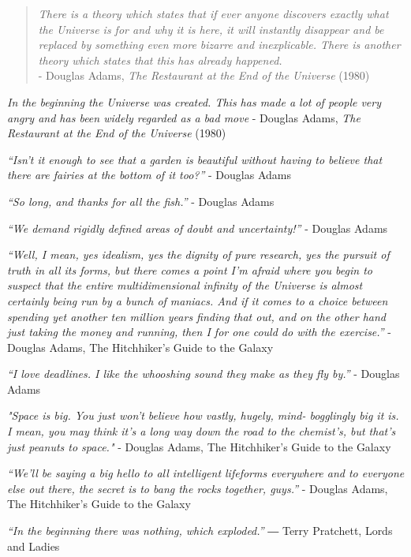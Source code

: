 

\begin{quote}
\emph{There is a theory which states that if ever anyone discovers exactly what the Universe is for 
and why it is here, it will instantly disappear and be replaced by something even more bizarre and inexplicable.
There is another theory which states that this has already happened.} \\
- Douglas Adams, \emph{The Restaurant at the End of the Universe} (1980)
\end{quote}


\emph{In the beginning the Universe was created.
This has made a lot of people very angry and has been widely regarded as a bad move}
- Douglas Adams, \emph{The Restaurant at the End of the Universe} (1980)


\emph{“Isn't it enough to see that a garden is beautiful without having to believe that there 
are fairies at the bottom of it too?” } 
- Douglas Adams

\emph{“So long, and thanks for all the fish.”} 
- Douglas Adams

\emph{“We demand rigidly defined areas of doubt and uncertainty!”} 
- Douglas Adams


\emph{“Well, I mean, yes idealism, yes the dignity of pure research, yes the pursuit of truth in all its forms, 
but there comes a point I'm afraid where you begin to suspect that the entire multidimensional infinity of 
the Universe is almost certainly being run by a bunch of maniacs. And if it comes to a choice between spending 
yet another ten million years finding that out, and on the other hand just taking the money and running, 
then I for one could do with the exercise.” }
- Douglas Adams, The Hitchhiker's Guide to the Galaxy

\emph{“I love deadlines. I like the whooshing sound they make as they fly by.” } 
- Douglas Adams

\emph{"Space is big. You just won't believe how vastly, hugely, mind- bogglingly big it is.
 I mean, you may think it's a long way down the road to the chemist's, but that's just peanuts to space."}
- Douglas Adams, The Hitchhiker's Guide to the Galaxy

\emph{“We'll be saying a big hello to all intelligent lifeforms everywhere and 
to everyone else out there, the secret is to bang the rocks together, guys.”}
- Douglas Adams, The Hitchhiker's Guide to the Galaxy


\emph{“In the beginning there was nothing, which exploded.”}
― Terry Pratchett, Lords and Ladies



